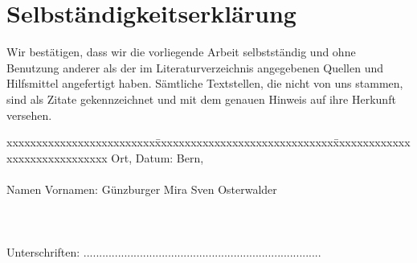 \chapter*{Selbständigkeitserklärung}
\label{chap:selbstaendigkeitserklaerung}

\vspace*{10mm} 

Wir bestätigen, dass wir die vorliegende Arbeit selbstständig und ohne Benutzung anderer als der im Literaturverzeichnis angegebenen Quellen und Hilfsmittel angefertigt haben. Sämtliche Textstellen, die nicht von uns stammen, sind als Zitate gekennzeichnet und mit dem genauen Hinweis auf ihre Herkunft versehen. 

\vspace{15mm}

\begin{tabbing}
xxxxxxxxxxxxxxxxxxxxxxxxx\=xxxxxxxxxxxxxxxxxxxxxxxxxxxxxx\=xxxxxxxxxxxxxxxxxxxxxxxxxxxxxx\kill
Ort, Datum:		\> Bern, \versiondate \\ \\ 
Namen Vornamen:	\> Günzburger Mira 	\> Sven Osterwalder \\ \\ \\ \\ 
Unterschriften:	\>......................................\>......................................\\
\end{tabbing}
